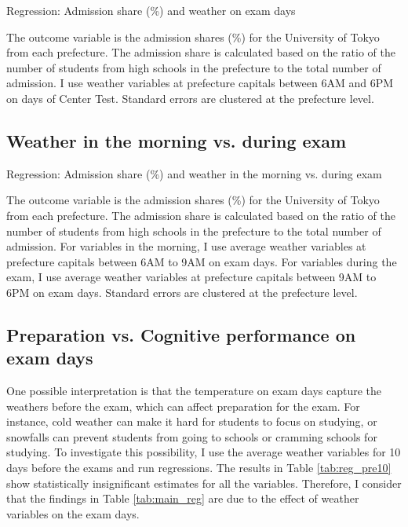 \documentclass[12pt,letterpaper]{article}
\begin{document}
\begin{table}[H]
  \center
  \caption{Regression: Admission share (\%) and weather on exam days}
  
  \label{tab:main_reg}
  \small
  \begin{tablenotes}
    \item
      The outcome variable is the admission shares (\%) for the University of Tokyo from each prefecture.
      The admission share is calculated based on the ratio of the number of students from high schools in the prefecture to the total number of admission.
      I use weather variables at prefecture capitals between 6AM and 6PM on days of Center Test.
      Standard errors are clustered at the prefecture level.
  \end{tablenotes}
\end{table}

\subsection{Weather in the morning vs. during exam}

\begin{table}[H]
  \center
  \caption{Regression: Admission share (\%) and weather in the morning vs. during exam}
  \scriptsize
  
  \label{tab:reg_morning_exam}
  \scriptsize
  \begin{tablenotes}
    \item
      The outcome variable is the admission shares (\%) for the University of Tokyo from each prefecture.
      The admission share is calculated based on the ratio of the number of students from high schools in the prefecture to the total number of admission.
      For variables in the morning, I use average weather variables at prefecture capitals between 6AM to 9AM on exam days.
      For variables during the exam, I use average weather variables at prefecture capitals between 9AM to 6PM on exam days.
      Standard errors are clustered at the prefecture level.
  \end{tablenotes}
\end{table}

\subsection{Preparation vs. Cognitive performance on exam days}

One possible interpretation is that the temperature on exam days capture the weathers before the exam, which can affect preparation for the exam. 
For instance, cold weather can make it hard for students to focus on studying, or snowfalls can prevent students from going to schools or cramming schools for studying.
To investigate this possibility, I use the average weather variables for 10 days before the exams and run regressions.
The results in Table \ref{tab:reg_pre10} show statistically insignificant estimates for all the variables. 
Therefore, I consider that the findings in Table \ref{tab:main_reg} are due to the effect of weather variables on the exam days.
\end{document}
